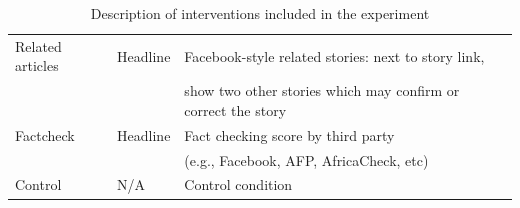 \documentclass[letterpaper, 12pt, parskip=full,DIV=12]{scrartcl}
\begin{document}
\begin{table}[htb!]
\begin{tabular}{l|l|l}
Related articles                                                                                                       & Headline                                                                                                     & Facebook-style related stories: next to story link,\\ & & show two other stories which may confirm or correct the story                                                                                                                                                                                                                                                                                               \\
Factcheck                                                                                                      & Headline                                                                                                     & Fact checking score by third party\\ & & (e.g., Facebook, AFP, AfricaCheck, etc)
 \\
Control                                                                                                        & N/A                                                                                                          & Control condition                                                                                                                                                                                                                                                                                                                                                                                              
\end{tabular}
\caption{Description of interventions included in the experiment}
\label{tab:treatments}
\end{table}
\end{document}
